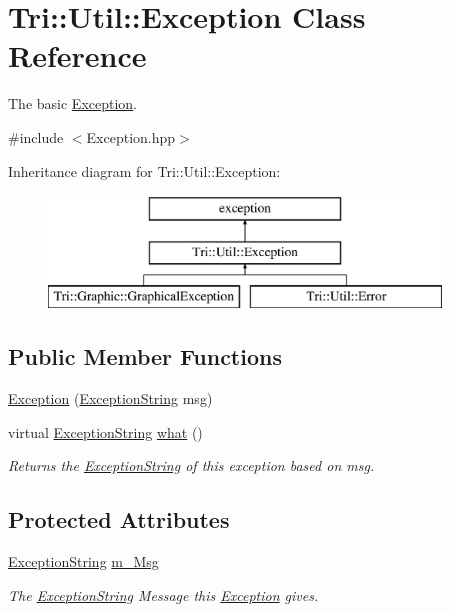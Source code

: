 \hypertarget{class_tri_1_1_util_1_1_exception}{}\section{Tri\+:\+:Util\+:\+:Exception Class Reference}
\label{class_tri_1_1_util_1_1_exception}


The basic \hyperlink{class_tri_1_1_util_1_1_exception}{Exception}.  




{\ttfamily \#include $<$Exception.\+hpp$>$}

Inheritance diagram for Tri\+:\+:Util\+:\+:Exception\+:\begin{figure}[H]
\begin{center}
\leavevmode
\includegraphics[height=3.000000cm]{class_tri_1_1_util_1_1_exception}
\end{center}
\end{figure}
\subsection*{Public Member Functions}
\begin{DoxyCompactItemize}
\item 
\hyperlink{class_tri_1_1_util_1_1_exception_acc1d14edbbbf14717314858236e7e00c}{Exception} (\hyperlink{namespace_tri_1_1_util_ac7d0a48237beb68f23ba39a6ad03b4bc}{Exception\+String} msg)
\item 
virtual \hyperlink{namespace_tri_1_1_util_ac7d0a48237beb68f23ba39a6ad03b4bc}{Exception\+String} \hyperlink{class_tri_1_1_util_1_1_exception_a71b6d4bd0cd41a5fe22d80154890a135}{what} ()
\begin{DoxyCompactList}\small\item\em Returns the \hyperlink{namespace_tri_1_1_util_ac7d0a48237beb68f23ba39a6ad03b4bc}{Exception\+String} of this exception based on msg. \end{DoxyCompactList}\end{DoxyCompactItemize}
\subsection*{Protected Attributes}
\begin{DoxyCompactItemize}
\item 
\hyperlink{namespace_tri_1_1_util_ac7d0a48237beb68f23ba39a6ad03b4bc}{Exception\+String} \hyperlink{class_tri_1_1_util_1_1_exception_a44c5170a7b4f36e26f60be26528660cb}{m\+\_\+\+Msg}
\begin{DoxyCompactList}\small\item\em The \hyperlink{namespace_tri_1_1_util_ac7d0a48237beb68f23ba39a6ad03b4bc}{Exception\+String} Message this \hyperlink{class_tri_1_1_util_1_1_exception}{Exception} gives. \end{DoxyCompactList}\end{DoxyCompactItemize}


